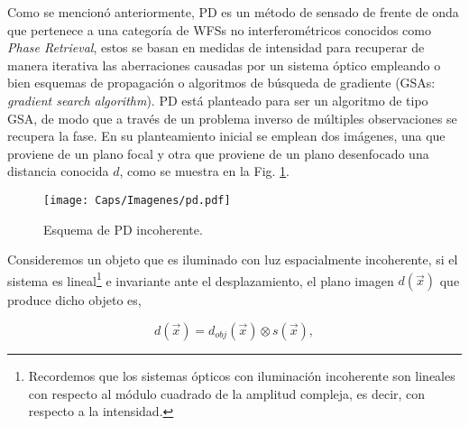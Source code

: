 
Como se mencionó anteriormente, PD es un método de sensado de frente de onda que pertenece a una categoría de WFSs no interferométricos conocidos como \textit{Phase Retrieval}, estos se basan en medidas de intensidad para recuperar de manera iterativa las aberraciones causadas por un sistema óptico empleando o bien esquemas de propagación o algoritmos de búsqueda de gradiente (GSAs: \textit{gradient search algorithm}). PD está planteado para ser un algoritmo de tipo GSA, de modo que a través de un problema inverso de múltiples observaciones se recupera la fase. En su planteamiento inicial se emplean dos imágenes, una que proviene de un plano focal y otra que proviene de un plano desenfocado una distancia conocida $d$, como se muestra en la Fig. \ref{fig:pd}. \\


\begin{figure}[!ht]
  \centering
    \texttt{[image: Caps/Imagenes/pd.pdf]}
  \caption{Esquema de PD incoherente.}
  \label{fig:pd}
\end{figure}

Consideremos un objeto que es iluminado con luz espacialmente incoherente, si el sistema es lineal\footnote{Recordemos que los sistemas ópticos con iluminación incoherente son lineales con respecto al módulo cuadrado de la amplitud compleja, es decir, con respecto a la intensidad.} e invariante ante el desplazamiento, el plano imagen $d(\vec{x})$ que produce dicho objeto es,

\begin{equation}
\label{eqD1}
	d(\vec{x})= d_{obj}(\vec{x}) \otimes s(\vec{x}),
\end{equation}

